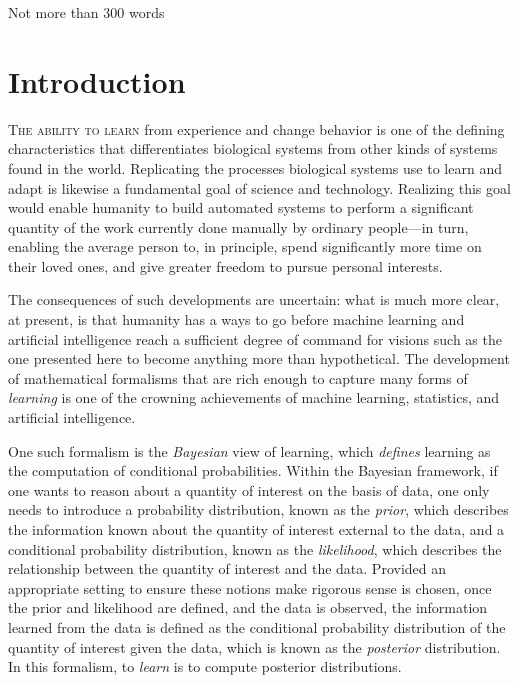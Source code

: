 \documentclass[11pt]{book}
\begin{document}
Not more than 300 words

\tableofcontents





\chapter{Introduction}

\lettrine{T}{he ability to learn} from experience and change behavior is one of the defining characteristics that differentiates biological systems from other kinds of systems found in the world.
Replicating the processes biological systems use to learn and adapt is likewise a fundamental goal of science and technology.
Realizing this goal would enable humanity to build automated systems to perform a significant quantity of the work currently done manually by ordinary people---in turn, enabling the average person to, in principle, spend significantly more time on their loved ones, and give greater freedom to pursue personal interests.

The consequences of such developments are uncertain: what is much more clear, at present, is that humanity has a ways to go before machine learning and artificial intelligence reach a sufficient degree of command for visions such as the one presented here to become anything more than hypothetical.
The development of mathematical formalisms that are rich enough to capture many forms of \emph{learning} is one of the crowning achievements of machine learning, statistics, and artificial intelligence.

One such formalism is the \emph{Bayesian} view of learning, which \emph{defines} learning as the computation of conditional probabilities.
Within the Bayesian framework, if one wants to reason about a quantity of interest on the basis of data, one only needs to introduce a probability distribution, known as the \emph{prior}, which describes the information known about the quantity of interest external to the data, and a conditional probability distribution, known as the \emph{likelihood}, which describes the relationship between the quantity of interest and the data.
Provided an appropriate setting to ensure these notions make rigorous sense is chosen, once the prior and likelihood are defined, and the data is observed, the information learned from the data is defined as the conditional probability distribution of the quantity of interest given the data, which is known as the \emph{posterior} distribution.
In this formalism, to \emph{learn} is to compute posterior distributions.
\end{document}
